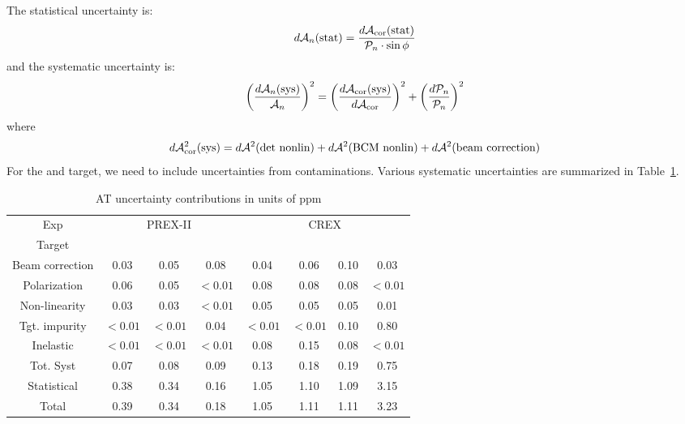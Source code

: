 The statistical uncertainty is:
\begin{equation}
    d\mathcal{A}_n(\text{stat}) = \frac{d\mathcal{A}_{\text{cor}}(\text{stat})}{\mathcal{P}_n \cdot \sin\phi}
\end{equation}
and the systematic uncertainty is:
\begin{equation}
    \left( \frac{d\mathcal{A}_n(\text{sys})}{\mathcal{A}_n} \right)^2 = 
	\left( \frac{d\mathcal{A}_{\text{cor}}(\text{sys})}{d\mathcal{A}_{\text{cor}}} \right)^2
	+ \left( \frac{d\mathcal{P}_n}{\mathcal{P}_n}\right)^2 
\end{equation}
where
\begin{equation}
    d\mathcal{A}^2_{\text{cor}}(\text{sys}) = d\mathcal{A}^2(\text{det\ nonlin}) + d\mathcal{A}^2(\text{BCM\ nonlin}) + d\mathcal{A}^2(\text{beam\ correction})
\end{equation}
For the \Pb and \Ca target, we need to include uncertainties from contaminations.
Various systematic uncertainties are summarized in Table~\ref{tab:AT_uncertainties}.
\begin{table}[!h]
    \centering
    \begin{tabular}{c c c c | c c c c}
	\hline
	Exp & \multicolumn{3}{c|}{PREX-II}  & \multicolumn{4}{c}{CREX}	\\
	Target	& \Carbon	& \ca	& \Pb	& \Carbon	& \ca	& \Ca	& \Pb	\\
	\hline
	Beam correction & 0.03  & 0.05  & 0.08  & 0.04  & 0.06  & 0.10  & 0.03	\\
	Polarization    & 0.06  & 0.05  & $<0.01$ & 0.08  & 0.08  & 0.08  & $<0.01$	\\
	Non-linearity   & 0.03  & 0.03  & $<0.01$ & 0.05  & 0.05  & 0.05  & 0.01	\\
	Tgt. impurity   & $<0.01$ & $<0.01$ & 0.04  & $<0.01$ & $<0.01$ & 0.10  & 0.80	\\
	Inelastic	& $<0.01$ & $<0.01$ & $<0.01$ & 0.08  & 0.15  & 0.08  & $<0.01$	\\
	\hline	
	Tot. Syst	& 0.07  & 0.08  & 0.09  & 0.13  & 0.18  & 0.19  & 0.75	\\
	Statistical	& 0.38  & 0.34  & 0.16  & 1.05  & 1.10  & 1.09  & 3.15	\\
	Total		& 0.39  & 0.34  & 0.18  & 1.05  & 1.11  & 1.11  & 3.23	\\
	\hline
    \end{tabular}
    \caption{AT uncertainty contributions in units of ppm}
    \label{tab:AT_uncertainties}
\end{table}

